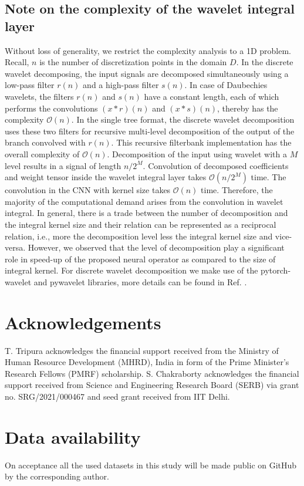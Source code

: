 \documentclass{article}
\begin{document}
\subsection*{Note on the complexity of the wavelet integral layer}
Without loss of generality, we restrict the complexity analysis to a 1D problem. Recall, $n$ is the number of discretization points in the domain $D$. In the discrete wavelet decomposing, the input signals are decomposed simultaneously using a low-pass filter $r(n)$ and a high-pass filter $s(n)$. In case of Daubechies wavelets, the filters $r(n)$ and $s(n)$ have a constant length, each of which performs the convolutions $(x*r)(n)$ and $(x*s)(n)$, thereby has the complexity $\mathcal{O}(n)$.
In the single tree format, the discrete wavelet decomposition uses these two filters for recursive multi-level decomposition of the output of the branch convolved with $r(n)$. This recursive filterbank implementation has the overall complexity of $\mathcal{O}(n)$. Decomposition of the input using wavelet with a $M$ level results in a signal of length $n/2^{M}$. Convolution of decomposed coefficients and weight tensor inside the wavelet integral layer takes $\mathcal{O}(n/2^{M})$ time.
The convolution in the CNN with kernel size takes $\mathcal{O}(n)$ time. Therefore, the majority of the computational demand arises from the convolution in wavelet integral. In general, there is a trade between the number of decomposition and the integral kernel size and their relation can be represented as a reciprocal relation, i.e., more the decomposition level less the integral kernel size and vice-versa. However, we observed that the level of decomposition play a significant role in speed-up of the proposed neural operator as compared to the size of integral kernel. For discrete wavelet decomposition we make use of the pytorch-wavelet and pywavelet libraries, more details can be found in Ref. \cite{lee2019pywavelets,cotter2020uses}.

\section*{Acknowledgements}
T. Tripura acknowledges the financial support received from the Ministry of Human Resource Development (MHRD), India in form of the Prime Minister's Research Fellows (PMRF) scholarship. S. Chakraborty acknowledges the financial support received from Science and Engineering Research Board (SERB) via grant no. SRG/2021/000467 and seed grant received from IIT Delhi.


\section*{Data availability}
On acceptance all the used datasets in this study will be made public on GitHub by the corresponding author.
\end{document}
